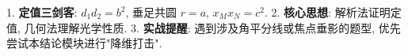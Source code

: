 \begin{summarybox}
1. \textbf{定值三剑客}: $d_1 d_2 = b^2$, 垂足共圆 $r=a$, $x_M x_N = c^2$.
2. \textbf{核心思想}: 解析法证明定值, 几何法理解光学性质.
3. \textbf{实战提醒}: 遇到涉及角平分线或焦点垂影的题型, 优先尝试本结论模块进行"降维打击".
\end{summarybox}